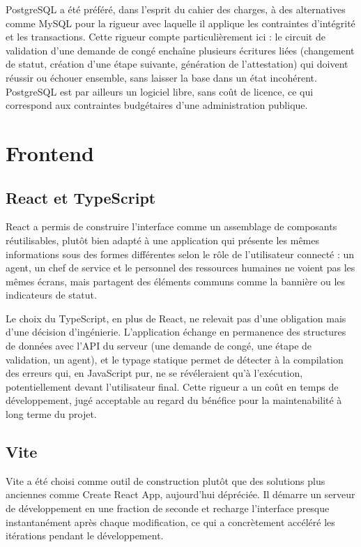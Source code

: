 PostgreSQL a été préféré, dans l'esprit du cahier des charges, à des alternatives comme MySQL pour la rigueur avec laquelle il applique les contraintes d'intégrité et les transactions. Cette rigueur compte particulièrement ici : le circuit de validation d'une demande de congé enchaîne plusieurs écritures liées (changement de statut, création d'une étape suivante, génération de l'attestation) qui doivent réussir ou échouer ensemble, sans laisser la base dans un état incohérent. PostgreSQL est par ailleurs un logiciel libre, sans coût de licence, ce qui correspond aux contraintes budgétaires d'une administration publique.

\section{Frontend}

\subsection{React et TypeScript}

React a permis de construire l'interface comme un assemblage de composants réutilisables, plutôt bien adapté à une application qui présente les mêmes informations sous des formes différentes selon le rôle de l'utilisateur connecté : un agent, un chef de service et le personnel des ressources humaines ne voient pas les mêmes écrans, mais partagent des éléments communs comme la bannière ou les indicateurs de statut.

Le choix du TypeScript, en plus de React, ne relevait pas d'une obligation mais d'une décision d'ingénierie. L'application échange en permanence des structures de données avec l'API du serveur (une demande de congé, une étape de validation, un agent), et le typage statique permet de détecter à la compilation des erreurs qui, en JavaScript pur, ne se révéleraient qu'à l'exécution, potentiellement devant l'utilisateur final. Cette rigueur a un coût en temps de développement, jugé acceptable au regard du bénéfice pour la maintenabilité à long terme du projet.

\subsection{Vite}

Vite a été choisi comme outil de construction plutôt que des solutions plus anciennes comme Create React App, aujourd'hui dépréciée. Il démarre un serveur de développement en une fraction de seconde et recharge l'interface presque instantanément après chaque modification, ce qui a concrètement accéléré les itérations pendant le développement.

